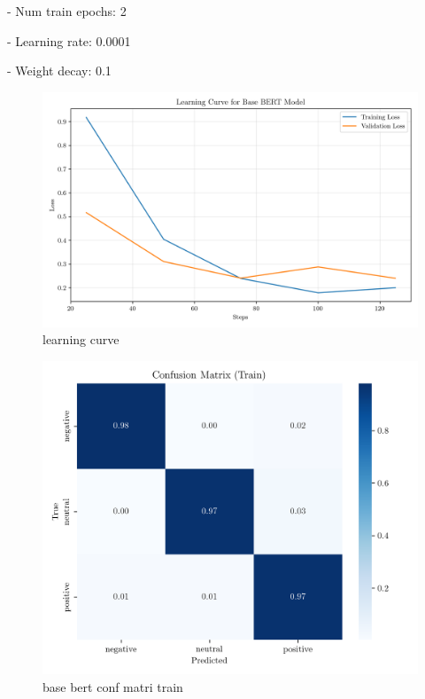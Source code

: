 \documentclass[conference]{IEEEtran}
\begin{document}
- Num train epochs: 2

- Learning rate: 0.0001

- Weight decay: 0.1

\begin{figure}[H]
    \centering
    \includegraphics[width=1\linewidth]{assets/base_bert_learning_curve.png}
    \caption{learning curve}
    \label{fig:base_bert_learning_curve}
\end{figure}

\begin{figure}[H]
    \centering
    \includegraphics[width=1\linewidth]{assets/base_bert_confusion_matrix_Train.png}
    \caption{base bert conf matri train}
    \label{fig:base_bert_confusion_matrix_Train}
\end{figure}
\end{document}
